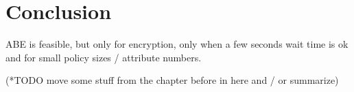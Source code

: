 \chapter{Conclusion}

ABE is feasible, but only for encryption, only when a few seconds wait time is ok and for small policy sizes / attribute numbers.

(*TODO move some stuff from the chapter before in here and / or summarize)